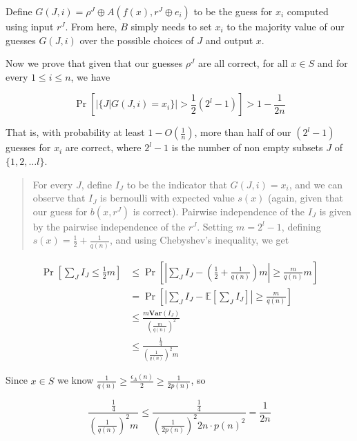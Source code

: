 Define \(G(J, i) = \rho^J \oplus A(f(x), r^J \oplus e_i)\) to be the
guess for \(x_i\) computed using input \(r^J\). From here, \(B\) simply
needs to set \(x_i\) to the majority value of our guesses \(G(J, i)\)
over the possible choices of \(J\) and output \(x\).

Now we prove that given that our guesses \(\rho^J\) are all correct, for
all \(x \in S\) and for every \(1 \leq i \leq n\), we have

\begin{equation*}
\Pr \left[ \left| \{ J | G(J, i) = x_i \} \right| > \frac{1}{2}(2^l - 1) \right] > 1 - \frac{1}{2n}
\end{equation*}

That is, with probability at least \(1 - O(\tfrac{1}{n})\), more than
half of our \((2^l - 1)\) guesses for \(x_i\) are correct, where
\(2^l - 1\) is the number of non empty subsets \(J\) of
\(\{1, 2, \dots l\}\).

\begin{quote}
For every \(J\), define \(I_J\) to be the indicator that
\(G(J, i) = x_i\), and we can observe that \(I_J\) is bernoulli with
expected value \(s(x)\) (again, given that our guess for \(b(x, r^J)\)
is correct). Pairwise independence of the \(I_J\) is given by the
pairwise independence of the \(r^J\). Setting \(m = 2^l - 1\), defining
\(s(x) = \tfrac{1}{2} + \tfrac{1}{q(n)}\), and using Chebyshev's
inequality, we get
\end{quote}

\begin{equation*}

\begin{aligned}
    \Pr \left[ \sum_{J}I_J \leq \frac{1}{2}m \right] &\leq \Pr \left[ \left| \sum_{J} I_J - \left(\frac{1}{2} + \frac{1}{q(n)} \right) m \right| \geq \frac{m}{q(n)}m \right] \\
    &= \Pr \left[ \left| \sum_{J} I_J - \mathbb{E} \left[ \sum_{J} I_J \right] \right| \geq \frac{m}{q(n)} \right] \\
    &\leq \frac{m \mathbf{Var}(I_J)}{\left(\frac{m}{q(n)}\right)^2} \\
    &\leq \frac{\frac{1}{4}}{\left( \frac{1}{q(n)} \right)^2 m}
\end{aligned}

\end{equation*}

Since \(x \in S\) we know
\(\frac{1}{q(n)} \geq \frac{\epsilon_A(n)}{2} \geq \frac{1}{2p(n)}\), so

\begin{equation*}
\frac{\frac{1}{4}}{\left( \frac{1}{q(n)} \right)^2 m} \leq \frac{\frac{1}{4}}{\left( \frac{1}{2p(n)} \right)^2 2n \cdot p(n)^2} = \frac{1}{2n} 
\end{equation*}

